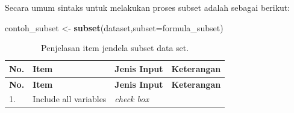 \documentclass[12pt,]{krantz}
\newenvironment{Shaded}{\begin{snugshade}}{\end{snugshade}}
\newcommand{\DataTypeTok}[1]{\textcolor[rgb]{0.13,0.29,0.53}{#1}}
\newcommand{\KeywordTok}[1]{\textcolor[rgb]{0.13,0.29,0.53}{\textbf{#1}}}
\newcommand{\NormalTok}[1]{#1}
\newcommand{\StringTok}[1]{\textcolor[rgb]{0.31,0.60,0.02}{#1}}
\begin{document}
Secara umum sintaks untuk melakukan proses subset adalah sebagai berikut:

\begin{Shaded}
\begin{Highlighting}[]
\NormalTok{contoh_subset <-}\StringTok{ }\KeywordTok{subset}\NormalTok{(dataset,}\DataTypeTok{subset=}\NormalTok{formula_subset)}
\end{Highlighting}
\end{Shaded}

\begin{longtable}[]{@{}llll@{}}
\caption{\label{tab:subset} Penjelasan item jendela subset data set.}\tabularnewline
\toprule
\begin{minipage}[b]{0.04\columnwidth}\raggedright
\textbf{No.}\strut
\end{minipage} & \begin{minipage}[b]{0.14\columnwidth}\raggedright
\textbf{Item}\strut
\end{minipage} & \begin{minipage}[b]{0.09\columnwidth}\raggedright
\textbf{Jenis Input}\strut
\end{minipage} & \begin{minipage}[b]{0.61\columnwidth}\raggedright
\textbf{Keterangan}\strut
\end{minipage}\tabularnewline
\midrule
\endfirsthead
\toprule
\begin{minipage}[b]{0.04\columnwidth}\raggedright
\textbf{No.}\strut
\end{minipage} & \begin{minipage}[b]{0.14\columnwidth}\raggedright
\textbf{Item}\strut
\end{minipage} & \begin{minipage}[b]{0.09\columnwidth}\raggedright
\textbf{Jenis Input}\strut
\end{minipage} & \begin{minipage}[b]{0.61\columnwidth}\raggedright
\textbf{Keterangan}\strut
\end{minipage}\tabularnewline
\midrule
\endhead
\begin{minipage}[t]{0.04\columnwidth}\raggedright
1.\strut
\end{minipage} & \begin{minipage}[t]{0.14\columnwidth}\raggedright
Include all variables\strut
\end{minipage} & \begin{minipage}[t]{0.09\columnwidth}\raggedright
\emph{check box}\strut
\end{minipage} & \begin{minipage}[t]{0.61\columnwidth}\raggedright

\end{minipage}
\end{longtable}
\end{document}
